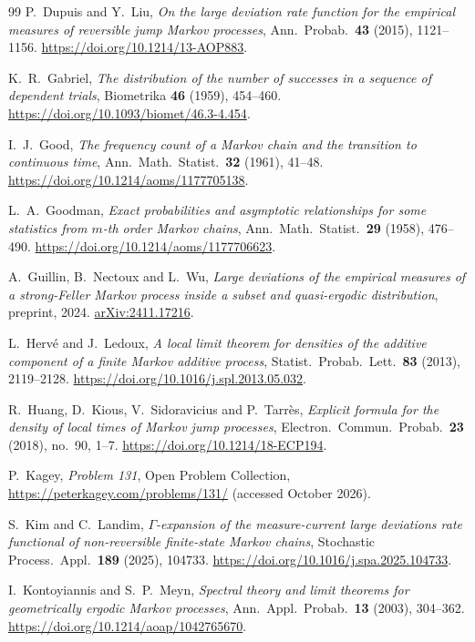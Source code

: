 \begin{thebibliography}{99}
P.~Dupuis and Y.~Liu, \emph{On the large deviation rate function for the
empirical measures of reversible jump Markov processes}, Ann.~Probab.~\textbf{43}
(2015), 1121--1156. \url{https://doi.org/10.1214/13-AOP883}.

K.~R.~Gabriel, \emph{The distribution of the number of successes in a sequence
of dependent trials}, Biometrika \textbf{46} (1959), 454--460.
\url{https://doi.org/10.1093/biomet/46.3-4.454}.

I.~J.~Good, \emph{The frequency count of a Markov chain and the transition to
continuous time}, Ann.~Math.~Statist.~\textbf{32} (1961), 41--48.
\url{https://doi.org/10.1214/aoms/1177705138}.

L.~A.~Goodman, \emph{Exact probabilities and asymptotic relationships for
some statistics from $m$-th order Markov chains}, Ann.~Math.~Statist.~\textbf{29}
(1958), 476--490. \url{https://doi.org/10.1214/aoms/1177706623}.

A.~Guillin, B.~Nectoux and L.~Wu, \emph{Large deviations of the empirical
measures of a strong-Feller Markov process inside a subset and quasi-ergodic
distribution}, preprint, 2024.
\href{https://arxiv.org/abs/2411.17216}{arXiv:2411.17216}.

L.~Herv\'e and J.~Ledoux, \emph{A local limit theorem for densities of the additive
component of a finite Markov additive process}, Statist.~Probab.~Lett.~\textbf{83}
(2013), 2119--2128. \url{https://doi.org/10.1016/j.spl.2013.05.032}.

R.~Huang, D.~Kious, V.~Sidoravicius and P.~Tarr\`es, \emph{Explicit formula for
the density of local times of Markov jump processes}, Electron.~Commun.~Probab.~\textbf{23} (2018), no.~90, 1--7. \url{https://doi.org/10.1214/18-ECP194}.

P.~Kagey, \emph{Problem 131}, Open Problem Collection,
\url{https://peterkagey.com/problems/131/} (accessed October 2026).

S.~Kim and C.~Landim, \emph{$\Gamma$-expansion of the measure-current large
deviations rate functional of non-reversible finite-state Markov chains},
Stochastic Process.~Appl.~\textbf{189} (2025), 104733.
\url{https://doi.org/10.1016/j.spa.2025.104733}.

I.~Kontoyiannis and S.~P.~Meyn, \emph{Spectral theory and limit theorems for
geometrically ergodic Markov processes}, Ann.~Appl.~Probab.~\textbf{13} (2003),
304--362. \url{https://doi.org/10.1214/aoap/1042765670}.


\end{thebibliography}

